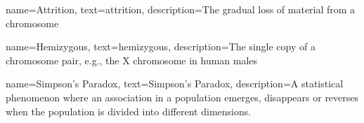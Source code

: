 
{
        name=Attrition,
        text=attrition,
        description={The gradual loss of material from a chromosome}
}


{
        name=Hemizygous,
        text=hemizygous,
        description={The single copy of a chromosome pair, e.g., the X chromosome in human males}
}


{
        name=Simpson's Paradox,
        text=Simpson's Paradox,
        description={A statistical phenomenon where an association in a population emerges, disappears or reverses when the population is divided into different dimensions.}
}
